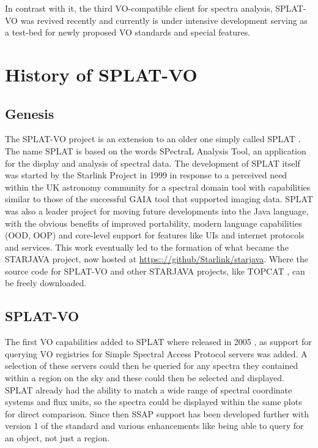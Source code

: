 \documentclass[final,authoryear,5p,times,twocolumn]{elsarticle}
\begin{document}
In contrast with it, the third VO-compatible client for spectra analysis,
SPLAT-VO \citep[][]{sun243} was revived recently and currently
is under intensive development serving as a test-bed for newly proposed VO
standards and special features.




\section{History of SPLAT-VO}
\subsection{Genesis}

The SPLAT-VO project is an extension to an older one simply called
SPLAT \citep[][]{2002ASPC..281..513B}.  The name SPLAT
is based on the words SPectraL Analysis Tool, an application for the
display and analysis of spectral data. The development of SPLAT itself
was started by the Starlink Project \citep{1982QJRAS..23..485D} in
1999 in response to a perceived need within the UK astronomy community
for a spectral domain tool with capabilities similar to those of the
successful GAIA tool \citep[][]{2000ASPC..216..615D}
that supported imaging data. SPLAT was also a leader project for
moving future developments into the Java language, with the obvious
benefits of improved portability, modern language capabilities (OOD,
OOP) and core-level support for features like UIs and internet
protocols and services. This work eventually led to the formation of
what became the STARJAVA project, now hosted at
\url{https:://github/Starlink/starjava}. Where the source code for
SPLAT-VO and other STARJAVA projects, like TOPCAT
\citep[][]{2005ASPC..347...29T}, can be freely
downloaded.

\subsection{SPLAT-VO}

The first VO capabilities added to SPLAT where released in 2005
\citep{2005ASPC..347...22D}, as support for querying VO registries for
Simple Spectral Access Protocol servers was added. A selection of
these servers could then be queried for any spectra they contained
within a region on the sky and these could then be selected and
displayed. SPLAT already had the ability to match a wide range of
spectral coordinate systems and flux units, so the spectra could be
displayed within the same plots for direct comparison. Since then SSAP
support has been developed further with version 1 of the standard and
various enhancements like being able to query for an object, not just
a region.
\end{document}
